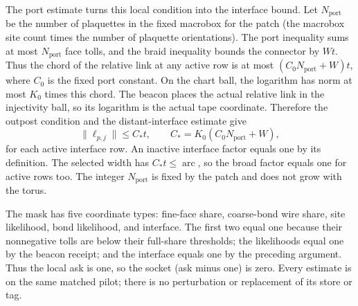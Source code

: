 The port estimate turns this local condition into the interface bound. Let
$N_{\mathrm{port}}$ be the number of plaquettes in the fixed macrobox for
the patch (the macrobox site count times the number of plaquette
orientations). The port inequality sums at most $N_{\mathrm{port}}$ face
tolls, and the braid inequality
bounds the connector by $Wt$. Thus the chord of the relative link at any
active row is at most $(C_0N_{\mathrm{port}}+W)t$, where $C_0$ is the fixed port constant.
On the chart ball, the logarithm has norm at most $K_0$ times this chord.
The beacon places the actual relative link in the injectivity ball, so its
logarithm is the actual tape coordinate. Therefore the outpost condition and
the distant-interface estimate give
\[
 \|\ell_{p,j}\|\leq C_*t,
 \qquad C_*=K_0(C_0N_{\mathrm{port}}+W),
\]
for each active interface row. An inactive interface factor equals one by its
definition. The selected width has $C_*t\leq\operatorname{arc}$, so the
broad factor equals one for active rows too. The integer $N_{\mathrm{port}}$ is fixed by the patch and does not grow with the torus.

The mask has five coordinate types: fine-face share, coarse-bond wire
share, site likelihood, bond likelihood, and interface. The first two equal one
because their nonnegative tolls are below their full-share thresholds; the
likelihoods equal one by the beacon receipt; and the interface equals one by the
preceding argument. Thus the local ask is one, so the socket (ask minus
one) is zero. Every estimate is on the same matched pilot; there is no
perturbation or replacement of its store or tag.

